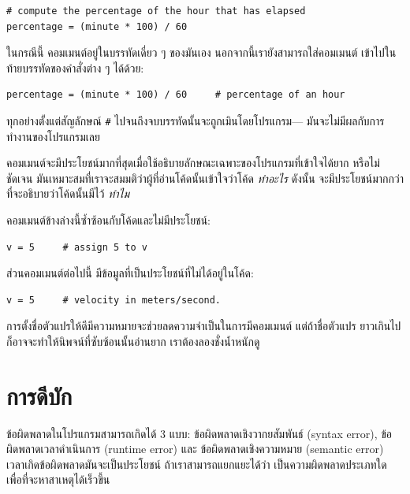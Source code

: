 \begin{verbatim}
# compute the percentage of the hour that has elapsed
percentage = (minute * 100) / 60
\end{verbatim}
%
ในกรณีนี้ คอมเมนต์อยู่ในบรรทัดเดี่ยว ๆ ของมันเอง  นอกจากนี้เรายังสามารถใส่คอมเมนต์
เข้าไปในท้ายบรรทัดของคำสั่งต่าง ๆ ได้ด้วย:

\begin{verbatim}
percentage = (minute * 100) / 60     # percentage of an hour
\end{verbatim}
%
ทุกอย่างตั้งแต่สัญลักษณ์ {\tt \#} ไปจนถึงจบบรรทัดนั้นจะถูกเมินโดยโปรแกรม---
มันจะไม่มีผลกับการทำงานของโปรแกรมเลย

คอมเมนต์จะมีประโยชน์มากที่สุดเมื่อใช้อธิบายลักษณะเฉพาะของโปรแกรมที่เข้าใจได้ยาก 
หรือไม่ชัดเจน  มันเหมาะสมที่เราจะสมมติว่าผู้ที่อ่านโค้ดนั้นเข้าใจว่าโค้ด {\em ทำอะไร}  
ดังนั้น จะมีประโยชน์มากกว่าที่จะอธิบายว่าโค้ดนั้นมีไว้ {\em ทำไม}

คอมเมนต์ข้างล่างนี้ซ้ำซ้อนกับโค้ดและไม่มีประโยชน์:

\begin{verbatim}
v = 5     # assign 5 to v
\end{verbatim}
%
ส่วนคอมเมนต์ต่อไปนี้ มีข้อมูลที่เป็นประโยชน์ที่ไม่ได้อยู่ในโค้ด:

\begin{verbatim}
v = 5     # velocity in meters/second. 
\end{verbatim}
%
การตั้งชื่อตัวแปรให้ดีมีความหมายจะช่วยลดความจำเป็นในการมีคอมเมนต์ แต่ถ้าชื่อตัวแปร
ยาวเกินไปก็อาจจะทำให้นิพจน์ที่ซับซ้อนนั้นอ่านยาก เราต้องลองชั่งน้ำหนักดู


\section{การดีบัก}

ข้อผิดพลาดในโปรแกรมสามารถเกิดได้ 3 แบบ: ข้อผิดพลาดเชิงวากยสัมพันธ์ (syntax error), 
ข้อผิดพลาดเวลาดำเนินการ (runtime error) และ ข้อผิดพลาดเชิงความหมาย (semantic error) 
เวลาเกิดข้อผิดพลาดมันจะเป็นประโยชน์ ถ้าเราสามารถแยกแยะได้ว่า เป็นความผิดพลาดประเภทใด
เพื่อที่จะหาสาเหตุได้เร็วขึ้น

